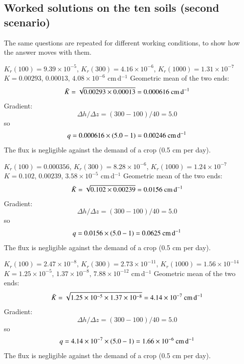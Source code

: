 \subsection{Worked solutions on the ten soils (second scenario)}
The same questions are repeated for different working conditions, to show how the answer moves with them.

\sol {}\ans $K_r(100)=9.39\times10^{-5}$, $K_r(300)=4.16\times10^{-6}$, $K_r(1000)=1.31\times10^{-7}$ \ans $K=0.00293$, $0.00013$, $4.08\times10^{-6}$ cm\,d$^{-1}$ \ans Geometric mean of the two ends: \[\bar K=\sqrt{0.00293\times0.00013}=0.000616\ \text{cm\,d$^{-1}$}\] \ans Gradient: \[\Delta h/\Delta z=(300-100)/40=5.0\]
so \[q=0.000616\times(5.0-1)=0.00246\ \text{cm\,d$^{-1}$}\] \ans The flux is negligible against the demand of a crop (0.5 cm per day). \finans

\sol {}\ans $K_r(100)=0.000356$, $K_r(300)=8.28\times10^{-6}$, $K_r(1000)=1.24\times10^{-7}$ \ans $K=0.102$, $0.00239$, $3.58\times10^{-5}$ cm\,d$^{-1}$ \ans Geometric mean of the two ends: \[\bar K=\sqrt{0.102\times0.00239}=0.0156\ \text{cm\,d$^{-1}$}\] \ans Gradient: \[\Delta h/\Delta z=(300-100)/40=5.0\]
so \[q=0.0156\times(5.0-1)=0.0625\ \text{cm\,d$^{-1}$}\] \ans The flux is negligible against the demand of a crop (0.5 cm per day). \finans

\sol {}\ans $K_r(100)=2.47\times10^{-8}$, $K_r(300)=2.73\times10^{-11}$, $K_r(1000)=1.56\times10^{-14}$ \ans $K=1.25\times10^{-5}$, $1.37\times10^{-8}$, $7.88\times10^{-12}$ cm\,d$^{-1}$ \ans Geometric mean of the two ends: \[\bar K=\sqrt{1.25\times10^{-5}\times1.37\times10^{-8}}=4.14\times10^{-7}\ \text{cm\,d$^{-1}$}\] \ans Gradient: \[\Delta h/\Delta z=(300-100)/40=5.0\]
so \[q=4.14\times10^{-7}\times(5.0-1)=1.66\times10^{-6}\ \text{cm\,d$^{-1}$}\] \ans The flux is negligible against the demand of a crop (0.5 cm per day). \finans


